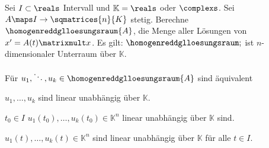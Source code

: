 \begin{satz}\label{homogene_dgl_loesungsraum}
  Sei \( I\subset \reals \) Intervall und \( \mathbb{K}=\reals \) oder \( \complexs \). Sei \( A\maps I\to \sqmatrices{n}{K} \) stetig. Berechne \( \homogenreddglloesungsraum{A} \), die Menge aller Lösungen von \( x'=A(t)\matrixmult x \). Es gilt: \( \homogenreddglloesungsraum; \) ist \( n \)-dimensionaler Unterraum über \( \mathbb{K} \).

  Für \( u_1,\ddots,u_k\in \homogenreddglloesungsraum{A} \) sind äquivalent
  \begin{eigenschaftenenumerate}
    \item \label{homogene_dgl_loesungsraum:loesungen_unabhaengig}\( u_1,\dotsc,u_k \) sind linear unabhängig über \( \mathbb{K} \).
    \item \label{homogene_dgl_loesungsraum:loesungen_unabhaengig_fuer_einen_wert} \texists \( t_0\in I \) \sd \( u_1(t_0),\dotsc,u_k(t_0)\in \mathbb{K}^n \) linear unabhängig über \( \mathbb{K} \) sind.
    \item \label{homogene_dgl_loesungsraum:loesungen_unabhaengig_fuer_alle_werte}\( u_1(t),\dotsc,u_k(t)\in \mathbb{K}^n \) sind linear unabhängig über \( \mathbb{K} \) für alle \( t\in I \).
  \end{eigenschaftenenumerate}
\end{satz}
